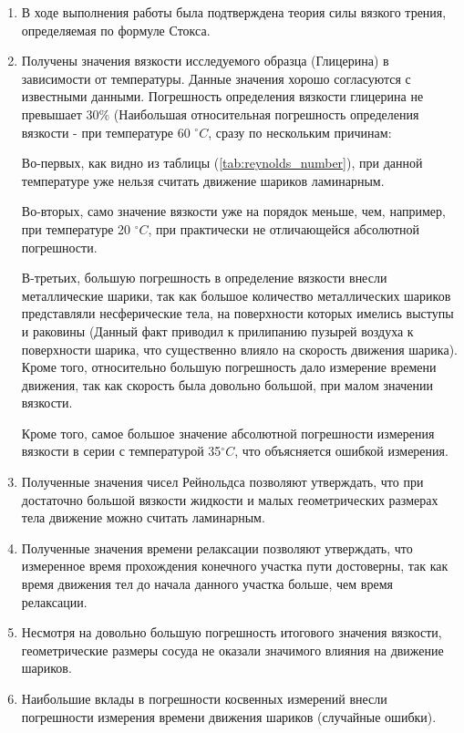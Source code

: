 \documentclass[a4paper, 12pt]{article}%
\begin{document}
\begin{enumerate}
	\item В ходе выполнения работы была подтверждена теория силы вязкого трения, определяемая по формуле Стокса.
	\item Получены значения вязкости исследуемого образца (Глицерина) в зависимости от температуры. Данные значения хорошо согласуются с известными данными. Погрешность определения вязкости глицерина не превышает 30$\%$ (Наибольшая относительная погрешность определения вязкости - при температуре 60 $^\circ C$, сразу по нескольким причинам:
	
	Во-первых, как видно из таблицы (\ref{tab:reynolds_number}), при данной температуре уже нельзя считать движение шариков ламинарным.
	
	Во-вторых, само значение вязкости уже на порядок меньше, чем, например, при температуре 20 $^\circ C$, при практически не отличающейся абсолютной погрешности.
	
	В-третьих, большую погрешность в определение вязкости внесли металлические шарики, так как большое количество металлических шариков представляли несферические тела, на поверхности которых имелись выступы и раковины (Данный факт приводил к прилипанию пузырей воздуха к поверхности шарика, что существенно влияло на скорость движения шарика). Кроме того, относительно большую погрешность дало измерение времени движения, так как скорость была довольно большой, при малом значении вязкости.
	
	Кроме того, самое большое значение абсолютной погрешности измерения вязкости в серии с температурой 35$^\circ C$, что объясняется ошибкой измерения.
	\item Полученные значения чисел Рейнольдса позволяют утверждать, что при достаточно большой вязкости жидкости и малых геометрических размерах тела движение можно считать ламинарным.
	\item Полученные значения времени релаксации позволяют утверждать, что измеренное время прохождения конечного участка пути достоверны, так как время движения тел до начала данного участка больше, чем время релаксации.
	\item Несмотря на довольно большую погрешность итогового значения вязкости, геометрические размеры сосуда не оказали значимого влияния на движение шариков.
	\item Наибольшие вклады в погрешности косвенных измерений внесли погрешности измерения времени движения шариков (случайные ошибки).
\end{enumerate}
\end{document}
